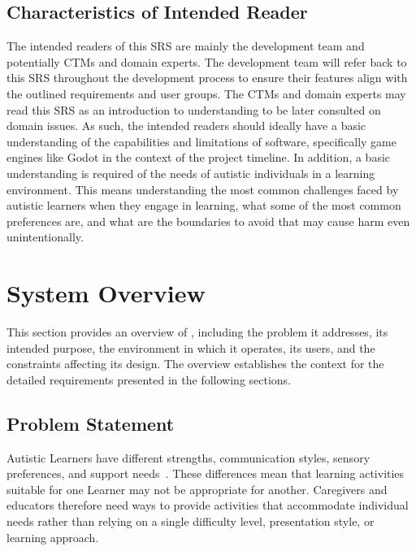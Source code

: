 \documentclass[12pt]{article}
\begin{document}
\subsection{Characteristics of Intended Reader} \label{sec_IntendedReader}

The intended readers of this SRS are mainly the development team and potentially CTMs and domain experts. The development team will refer back to this SRS throughout the development process to ensure their features align with the outlined requirements and user groups. The CTMs and domain experts may read this SRS as an introduction to understanding \progname{} to be later consulted on domain issues. As such, the intended readers should ideally have a basic understanding of the capabilities and limitations of software, specifically game engines like Godot in the context of the project timeline. In addition, a basic understanding is required of the needs of autistic individuals in a learning environment. This means understanding the most common challenges faced by autistic learners when they engage in learning, what some of the most common preferences are, and what are the boundaries to avoid that may cause harm even unintentionally.

\section{System Overview}

This section provides an overview of \progname{}, including the problem it
addresses, its intended purpose, the environment in which it operates, its
users, and the constraints affecting its design. The overview establishes the
context for the detailed requirements presented in the following sections.

\subsection{Problem Statement} \label{sec_SystemProblem}

Autistic Learners have different strengths, communication styles, sensory
preferences, and support needs~\citep{nimhAutism2025}. These differences mean
that learning activities
suitable for one Learner may not be appropriate for another. Caregivers and
educators therefore need ways to provide activities that accommodate individual
needs rather than relying on a single difficulty level, presentation style, or
learning approach.
\end{document}
